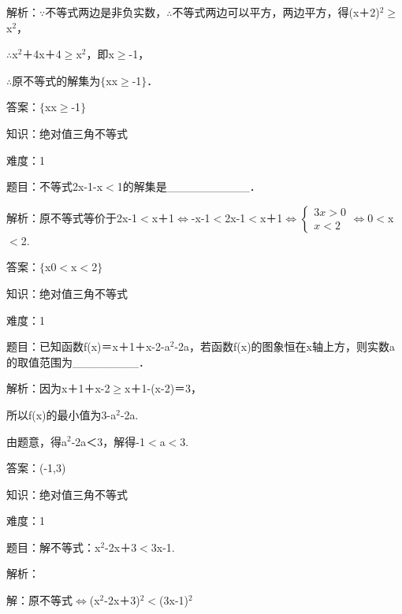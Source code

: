 \documentclass{article} %
\begin{document}
解析：$\mathrm{\because}$不等式两边是非负实数，$\mathrm{\therefore}$不等式两边可以平方，两边平方，得(x＋2)${}^{2}$$\mathrm{\ge}$x${}^{2}$，

$\mathrm{\therefore}$x${}^{2}$＋4x＋4$\mathrm{\ge}$x${}^{2}$，即x$\mathrm{\ge}$-1，

$\mathrm{\therefore}$原不等式的解集为$\mathrm{\{}$x{\textbar}x$\mathrm{\ge}$-1$\mathrm{\}}$．

答案：$\mathrm{\{}$x{\textbar}x$\mathrm{\ge}$-1$\mathrm{\}}$



知识：绝对值三角不等式

难度：1

题目：不等式{\textbar}2x-1{\textbar}-x$\mathrm{<}$1的解集是\_\_\_\_\_\_\_\_\_\_．

解析：原不等式等价于{\textbar}2x-1{\textbar}$\mathrm{<}$x＋1$\mathrm{\Leftrightarrow }$-x-1$\mathrm{<}$2x-1$\mathrm{<}$x＋1$\mathrm{\Leftrightarrow }$$\left\{\begin{array}{r}
3x>0\\
x<2
\end{array} \right.$$\mathrm{\Leftrightarrow }$0$\mathrm{<}$x$\mathrm{<}$2.

答案：$\mathrm{\{}$x{\textbar}0$\mathrm{<}$x$\mathrm{<}$2$\mathrm{\}}$



知识：绝对值三角不等式

难度：1

题目：已知函数f(x)＝{\textbar}x＋1{\textbar}＋{\textbar}x-2{\textbar}-{\textbar}a${}^{2}$-2a{\textbar}，若函数f(x)的图象恒在x轴上方，则实数a的取值范围为\_\_\_\_\_\_\_\_．

解析：因为{\textbar}x＋1{\textbar}＋{\textbar}x-2{\textbar}$\mathrm{\ge}${\textbar}x＋1-(x-2){\textbar}＝3，

所以f(x)的最小值为3-{\textbar}a${}^{2}$-2a{\textbar}.

由题意，得{\textbar}a${}^{2}$-2a{\textbar}＜3，解得-1$\mathrm{<}$a$\mathrm{<}$3.

答案：(-1,3)



知识：绝对值三角不等式

难度：1

题目：解不等式：{\textbar}x${}^{2}$-2x＋3{\textbar}$\mathrm{<}${\textbar}3x-1{\textbar}.

解析：

解：原不等式$\mathrm{\Leftrightarrow }$(x${}^{2}$-2x＋3)${}^{2}$$\mathrm{<}$(3x-1)${}^{2}$
\end{document}
